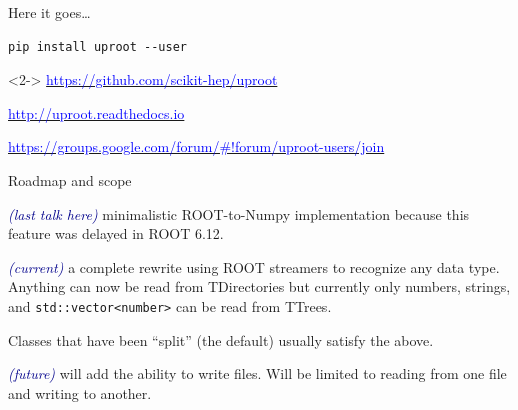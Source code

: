\documentclass[aspectratio=169]{beamer}
\begin{document}
\begin{frame}[fragile]{Here it goes\ldots}
\vspace{0.5 cm}
\huge
\begin{center}
\begin{minipage}{0.8\linewidth}
\begin{verbatim}
pip install uproot --user
\end{verbatim}
\end{minipage}

\Large
\begin{uncoverenv}<2->
\vspace{1 cm}
\href{https://github.com/scikit-hep/uproot}{\textcolor{blue}{https://github.com/scikit-hep/uproot}}

\vspace{0.5 cm}
\href{http://uproot.readthedocs.io}{\textcolor{blue}{http://uproot.readthedocs.io}}

\vspace{0.5 cm}
\href{https://groups.google.com/forum/#!forum/uproot-users/join}{\textcolor{blue}{https://groups.google.com/forum/\#!forum/uproot-users/join}}
\end{uncoverenv}
\end{center}
\end{frame}

\begin{frame}{Roadmap and scope}
\vspace{0.5 cm}
\large
\begin{description}\setlength{\itemsep}{0.5 cm}
\item[version 1.x] \textcolor{darkblue}{\it (last talk here)} minimalistic ROOT-to-Numpy implementation because this feature was delayed in ROOT 6.12.

\item[version 2.x] \textcolor{darkblue}{\it (current)} a complete rewrite using ROOT streamers to recognize any data type. Anything can now be read from TDirectories but currently only numbers, strings, and {\tt std::vector<number>} can be read from TTrees.

\vspace{0.5 cm}
Classes that have been ``split'' (the default) usually satisfy the above.

\item[version 3.x] \textcolor{darkblue}{\it (future)} will add the ability to write files. Will be limited to reading from one file and writing to another.
\end{description}
\end{frame}
\end{document}
